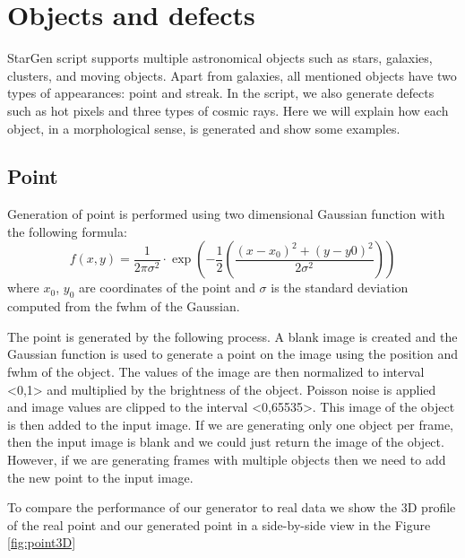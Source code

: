 \section{Objects and defects}
StarGen script supports multiple astronomical objects such as stars, galaxies, clusters, and moving objects. Apart from galaxies, all mentioned objects have two types of appearances: point and streak. In the script, we also generate defects such as hot pixels and three types of cosmic rays. Here we will explain how each object, in a morphological sense, is generated and show some examples. 

\subsection{Point}
Generation of point is performed using two dimensional Gaussian function with the following formula: 
\begin{equation} \label{eq:gauss}
    f(x,y) = \frac{1}{2 \pi \sigma^2} \cdot \exp{\left( - \frac{1}{2} \left( \frac{(x - x_0)^2 + (y - y0)^2 }{2 \sigma^2} \right) \right)}
\end{equation}
where $x_0$, $y_0$ are coordinates of the point and $\sigma$ is the standard deviation computed from the fwhm of the Gaussian. 

The point is generated by the following process. A blank image is created and the Gaussian function is used to generate a point on the image using the position and fwhm of the object. The values of the image are then normalized to interval <0,1> and multiplied by the brightness of the object. Poisson noise is applied and image values are clipped to the interval <0,65535>. This image of the object is then added to the input image. If we are generating only one object per frame, then the input image is blank and we could just return the image of the object. However, if we are generating frames with multiple objects then we need to add the new point to the input image. 

To compare the performance of our generator to real data we show the 3D profile of the real point and our generated point in a side-by-side view in the Figure \ref{fig:point3D}

